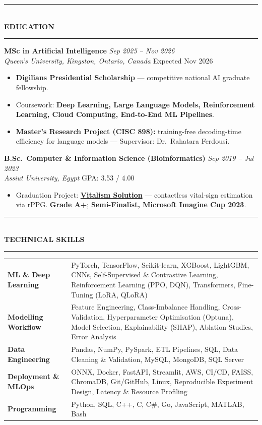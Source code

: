 \documentclass[10pt, a4paper]{article}
\newcommand{\cvsection}[1]{%
  \vspace{3pt}%
  {\color{navy}\rule{\linewidth}{1.1pt}}\\[0.5pt]%
  {\color{navy}\bfseries\fontsize{9.5}{11}\selectfont\uppercase{#1}}\\[-4pt]%
  {\color{teal}\rule{\linewidth}{0.6pt}}%
  \vspace{2pt}%
}
\newcommand{\cventry}[4]{%
  \vspace{2.5pt}%
  \textbf{\color{darkgray}#1} \hfill {\color{midgray}\textit{#3}}\\[-1.5pt]%
  {\color{teal}\textit{#2}} \hfill {\color{midgray}#4}%
}
\newenvironment{cvitems}{%
  \begin{itemize}[leftmargin=11pt, itemsep=0.5pt, parsep=0pt, topsep=1pt,
                  label={\textcolor{teal}{$\bullet$}}]
}{%
  \end{itemize}%
}
\begin{document}
\cvsection{Education}

\cventry{MSc in Artificial Intelligence}{Queen's University, Kingston, Ontario, Canada}
        {Sep 2025 -- Nov 2026}{Expected Nov 2026}
\begin{cvitems}
  \item \textbf{Digilians Presidential Scholarship} --- competitive national AI graduate fellowship.
  \item Coursework: \textbf{Deep Learning, Large Language Models, Reinforcement Learning, Cloud Computing, End-to-End ML Pipelines}.
  \item \textbf{Master's Research Project (CISC 898):} training-free decoding-time efficiency for language models --- Supervisor: Dr.\ Rahatara Ferdousi.
\end{cvitems}

\cventry{B.Sc.\ Computer \& Information Science (Bioinformatics)}{Assiut University, Egypt}
        {Sep 2019 -- Jul 2023}{GPA: 3.53 / 4.00}
\begin{cvitems}
  \item Graduation Project: \href{https://vitalismsolution.github.io/}{\textbf{Vitalism Solution}} --- contactless vital-sign estimation via rPPG. \textbf{Grade A+}; \textbf{Semi-Finalist, Microsoft Imagine Cup 2023}.
\end{cvitems}

\cvsection{Technical Skills}

\renewcommand{\arraystretch}{1.1}
\begin{tabularx}{\linewidth}{@{}>{\raggedright\hyphenpenalty=10000\arraybackslash}p{35mm} X@{}}
\textbf{ML \& Deep Learning} &
PyTorch, TensorFlow, Scikit-learn, XGBoost, LightGBM, CNNs, Self-Supervised \& Contrastive Learning, Reinforcement Learning (PPO, DQN), Transformers, Fine-Tuning (LoRA, QLoRA) \\

\textbf{Modelling Workflow} &
Feature Engineering, Class-Imbalance Handling, Cross-Validation, Hyperparameter Optimisation (Optuna), Model Selection, Explainability (SHAP), Ablation Studies, Error Analysis \\

\textbf{Data Engineering} &
Pandas, NumPy, PySpark, ETL Pipelines, SQL, Data Cleaning \& Validation, MySQL, MongoDB, SQL Server \\

\textbf{Deployment \& MLOps} &
ONNX, Docker, FastAPI, Streamlit, AWS, CI/CD, FAISS, ChromaDB, Git/GitHub, Linux, Reproducible Experiment Design, Latency \& Resource Profiling \\

\textbf{Programming} &
Python, SQL, C++, C, C\#, Go, JavaScript, MATLAB, Bash \\
\end{tabularx}
\end{document}
